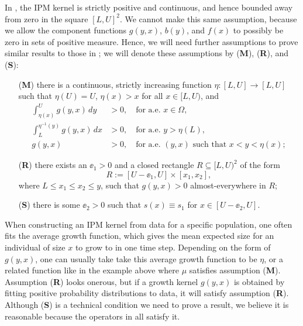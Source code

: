 In \cite{Ellner2006}, the IPM kernel is strictly positive and continuous, and hence bounded away from zero in the square $[L, U]^2$. We cannot make this same assumption, because we allow the component functions $g(y,x)$, $b(y)$, and $f(x)$ to possibly be zero in sets of positive measure. Hence, we will need further assumptions to prove similar results to those in \cite{Ellner2006}; we will denote these assumptions by (\textbf{M}), (\textbf{R}), and (\textbf{S}):

\begin{enumerate}
	\item[(\textbf{M})] there is a continuous, strictly increasing function $\eta:[L,U] \to [L,U]$ such that $\eta(U)=U$, $\eta(x)>x$ for all $x \in [L,U)$, and
	\begin{align}
		\int_{\eta(x)}^U g(y,x) \, dy &> 0, \quad \text{for a.e. } x \in \Omega, \label{eqn:M1}\\
		\int_L^{\eta^{-1}(y)} g(y,x) \,dx &> 0, \quad \text{for a.e. } y > \eta(L), \label{eqn:M2}\\
		g(y, x) &> 0, \quad \text{for a.e. } (y, x) \text{ such that } x < y < \eta(x); \label{eqn:M3}
	\end{align}
	\item[(\textbf{R})] there exists an $\ee_1 > 0$ and a closed rectangle $R \subseteq [L, U)^2$ of the form
	\[R := [U - \ee_1, U] \times [x_1, x_2],\]
	where $L \leq x_1 \leq x_2 \leq y$, such that $g(y, x) > 0$ almost-everywhere in $R$;
	\item[(\textbf{S})]  there is some $\ee_2 > 0$ such that $s(x) \equiv s_1$ for $x \in [U - \ee_2, U]$.
\end{enumerate} 
When constructing an IPM kernel from data for a specific population, one often fits the average growth function, which gives the mean expected size for an individual of size $x$ to grow to in one time step. Depending on the form of $g(y, x)$, one can usually take take this average growth function to be $\eta$, or a related function like in the example above where $\mu$ satisfies assumption (\textbf{M}). Assumption (\textbf{R}) looks onerous, but if a growth kernel $g(y, x)$ is obtained by fitting positive probability distributions to data, it will satisfy assumption (\textbf{R}). Although (\textbf{S}) is a technical condition we need to prove a result, we believe it is reasonable because the operators in \cite{Ohlberger2020, Stubberud2019, Vindenes2014, Vindenes2015} all satisfy it.

